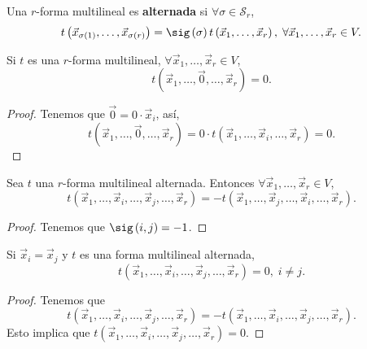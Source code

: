 \begin{fdefinition}[]
\normalfont Una $\displaystyle r $-forma multilineal es \textbf{alternada} si $\displaystyle \forall \sigma \in \mathcal{S}_{r} $, 
\[t\left(\vec{x}_{\sigma\left(1\right)}, \ldots, \vec{x}_{\sigma\left(r\right)}\right) = \sig\left(\sigma \right)t\left(\vec{x}_{1}, \ldots, \vec{x}_{r}\right), \; \forall \vec{x}_{1}, \ldots, \vec{x}_{r} \in V .\]
\end{fdefinition}

\begin{fprop}[]
\normalfont Si $\displaystyle t $ es una $\displaystyle r $-forma multilineal, $\displaystyle \forall \vec{x}_{1}, \ldots, \vec{x}_{r} \in V $,
\[t\left(\vec{x}_{1}, \ldots, \vec{0}, \ldots, \vec{x}_{r}\right) = 0 .\]
\end{fprop}
\begin{proof} Tenemos que $\displaystyle \vec{0} = 0 \cdot \vec{x}_{i}  $, así, 
\[t\left(\vec{x}_{1}, \ldots, \vec{0}, \ldots, \vec{x}_{r}\right) =0 \cdot t\left(\vec{x}_{1}, \ldots, \vec{x}_{i}, \ldots, \vec{x}_{r}\right) = 0.\]
\end{proof}

\begin{fprop}[]
\normalfont Sea $\displaystyle t $ una $\displaystyle r $-forma multilineal alternada. Entonces $\displaystyle \forall \vec{x}_{1}, \ldots, \vec{x}_{r} \in V $,
\[t\left(\vec{x}_{1}, \ldots, \vec{x}_{i}, \ldots, \vec{x}_{j}, \ldots, \vec{x}_{r}\right) = -t\left(\vec{x}_{1}, \ldots, \vec{x}_{j}, \ldots, \vec{x}_{i}, \ldots, \vec{x}_{r}\right) .\]
\end{fprop}

\begin{proof}
Tenemos que $\displaystyle \sig\left(i,j\right) = -1 $.
\end{proof}

\begin{fprop}[]
\normalfont Si $\displaystyle \vec{x}_{i} = \vec{x}_{j} $ y $\displaystyle t $ es una forma multilineal alternada,
\[t\left(\vec{x}_{1}, \ldots, \vec{x}_{i}, \ldots, \vec{x}_{j}, \ldots, \vec{x}_{r}\right) = 0, \; i \neq j .\]
\end{fprop}
\begin{proof}
Tenemos que 
\[t\left(\vec{x}_{1}, \ldots, \vec{x}_{i}, \ldots, \vec{x}_{j}, \ldots, \vec{x}_{r}\right) = -t\left(\vec{x}_{1}, \ldots, \vec{x}_{i}, \ldots, \vec{x}_{j}, \ldots, \vec{x}_{r}\right) .\]
Esto implica que $\displaystyle t\left(\vec{x}_{1}, \ldots, \vec{x}_{i}, \ldots, \vec{x}_{j}, \ldots, \vec{x}_{r}\right) = 0 $.
\end{proof}

